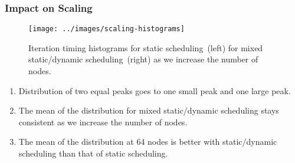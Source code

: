 \begin{frame}
\frametitle{Impact on Scaling}
\begin{figure}[ht!]
\label{fig:scaling-histograms}
\begin{center}
\texttt{[image: ../images/scaling-histograms]}
\end{center}
\caption{\label{fig:scaling-histograms} Iteration timing histograms 
for static scheduling~(left) for mixed static/dynamic scheduling~(right) as we increase the 
number of nodes.}
\end{figure}

\begin{enumerate}
\tiny \item \tiny Distribution of two equal peaks goes to one small
peak and one large peak. 
\item \tiny The mean of the distribution for mixed 
static/dynamic scheduling stays consistent 
as we increase the number of nodes. 
\item \tiny The mean of the distribution at 64 nodes is better 
  with static/dynamic scheduling than that of static
  scheduling. %
\end{enumerate}
\end{frame}

